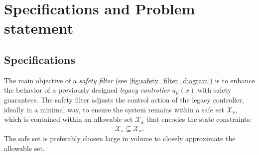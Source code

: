 \documentclass[lettersize,journal]{IEEEtran}
\newcommand{\afterReviewChangedBox}[1]{{\color{orange}#1}}
\begin{document}






\section{Specifications and Problem statement} \label{sec:specification_and_problem_statement}

\subsection{Specifications}

The main objective of a \emph{safety filter} (see \cref{fig:safety_filter_diagram}) is to enhance the behavior of a previously designed \emph{legacy controller} $u_n(x)$ with safety guarantees.
\afterReviewChangedBox{The safety filter adjusts the control action of the legacy controller, ideally in a minimal way, to ensure the system remains within a safe set $\mathcal X_s$, which is contained within an allowable set $\mathcal X_a$ that encodes the state constraints:}
\begin{align} \label{eq:xs_subsetneq_xa}
   \mathcal X_s \subseteq \mathcal X_a.
\end{align}
The safe set is preferably chosen large in volume to closely approximate the allowable set.
\end{document}
